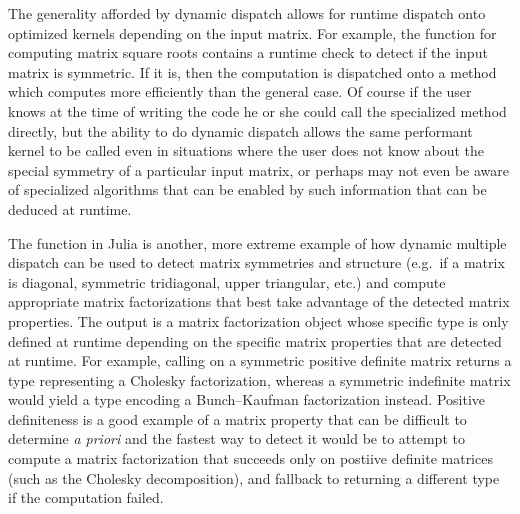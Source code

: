 The generality afforded by dynamic dispatch allows for runtime dispatch onto
optimized kernels depending on the input matrix. For example, the
 function for computing matrix square roots contains a
runtime check to detect if the input matrix is symmetric. If it is, then the
computation is dispatched onto a  method which
computes more efficiently than the general case. Of course if the user knows at
the time of writing the code he or she could call the specialized method
directly, but the ability to do dynamic dispatch allows the same performant
kernel to be called even in situations where the user does not know about the
special symmetry of a particular input matrix, or perhaps may not even be aware
of specialized algorithms that can be enabled by such information that can be
deduced at runtime.

The  function in Julia is another, more extreme example of how
dynamic multiple dispatch can be used to detect matrix symmetries and structure
(e.g.\ if a matrix is diagonal, symmetric tridiagonal, upper triangular, etc.)
and compute appropriate matrix factorizations that best take advantage of the
detected matrix properties. The output is a matrix factorization object whose
specific type is only defined at runtime depending on the specific matrix
properties that are detected at runtime. For example, calling 
on a symmetric positive definite matrix returns a  type
representing a Cholesky factorization, whereas a symmetric indefinite matrix
would yield a  type encoding a Bunch--Kaufman factorization
instead. Positive definiteness is a good example of a matrix property that can
be difficult to determine \textit{a priori} and the fastest way to detect it
would be to attempt to compute a matrix factorization that succeeds only on
postiive definite matrices (such as the Cholesky decomposition), and fallback
to returning a different type if the computation failed.

